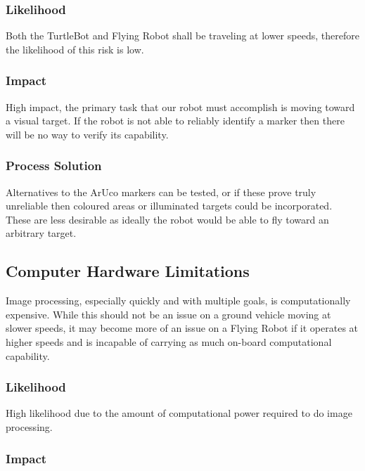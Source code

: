 \documentclass{article}
\begin{document}
		\subsubsection{Likelihood}
 
		Both the TurtleBot and Flying Robot shall be traveling at lower speeds, therefore the likelihood of this risk is low.
		
		\subsubsection{Impact}
		
		High impact, the primary task that our robot must accomplish is moving toward a visual target. If the robot is not able to reliably identify a marker then there will be no way to verify its capability.
		
		\subsubsection{Process Solution}
		
		Alternatives to the ArUco markers can be tested, or if these prove truly unreliable then coloured areas or illuminated targets could be incorporated. These are less desirable as ideally the robot would be able to fly toward an arbitrary target.
		
	\subsection{Computer Hardware Limitations}
	
	Image processing, especially quickly and with multiple goals, is computationally expensive. While this should not be an issue on a ground vehicle moving at slower speeds, it may become more of an issue on a Flying Robot if it operates at higher speeds and is incapable of carrying as much on-board computational capability.
	
		\subsubsection{Likelihood}

		High likelihood due to the amount of computational power required to do image processing. 
		
		\subsubsection{Impact}
		
\end{document}
